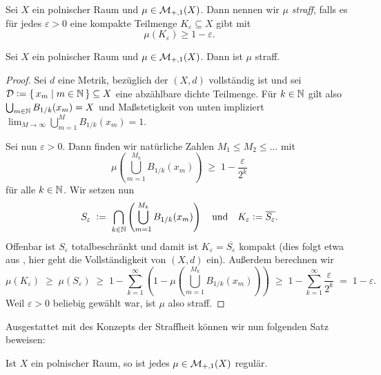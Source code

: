 \documentclass[../main/main.tex]{subfiles}
\begin{document}
	\begin{Definition}
		Sei $X$ ein polnischer Raum und $\mu \in \mathcal{M}_{+,1}(X)$. Dann nennen wir 
		$\mu$ \emph{straff}, falls es für jedes $\varepsilon > 0$ eine kompakte Teilmenge
		$K_\varepsilon \subseteq X$ gibt mit 
		\[ \mu(K_\varepsilon) \geq 1  - \varepsilon \text{.} \]
	\end{Definition}

	\begin{Satz}
		\label{thm:tightness}
		Sei $X$ ein polnischer Raum und $\mu \in \mathcal{M}_{+,1}(X)$. Dann ist $\mu$ straff.
	\end{Satz}

	\begin{proof}
		Sei $d$ eine Metrik, bezüglich der $(X, d)$ vollständig ist und sei 
		$\mathcal{D} \vcentcolon = \left\{\, x_m \; \middle| \; m \in \mathbb{N} \,\right\} \subseteq X$ eine abzählbare dichte Teilmenge. 
		Für $k \in \mathbb{N}$ gilt also $\bigcup_{m \in \mathbb{N}} B_{1/k}(x_m) = X$ und Maßstetigkeit 
		von unten impliziert 
		$\lim_{M \to \infty} \bigcup_{m=1}^{M} B_{1/k}(x_m) = 1$.
		
		Sei nun $\varepsilon > 0$. Dann finden wir natürliche Zahlen $M_1 \leq M_2 \leq \dots$ mit
		\[ \mu\left( \bigcup_{m=1}^{M_k} B_{1/k}(x_m) \right) \; \geq \; 1 - \frac{\varepsilon}{2^k} \]
		für alle $k \in \mathbb{N}$. Wir setzen nun
		\[ S_\varepsilon 
			\; \vcentcolon = \; \bigcap_{k \in \mathbb{N}} \left( \bigcup_{m=1}^{M_k} B_{1/k}(x_m) \right) 
			\quad \text{und} \quad K_\varepsilon \vcentcolon = \overline{S_\varepsilon} \text{.} \]
		Offenbar ist $S_\varepsilon$ totalbeschränkt und damit ist $K_\varepsilon = \overline{S_\varepsilon}$ 
		kompakt (dies folgt etwa aus \cite[Satz 2.3.8]{Simon.2015}, 
		hier geht die Vollständigkeit von $(X, d)$ ein).
		Außerdem berechnen wir
		\[ \mu(K_\varepsilon) 
			\; \geq \; \mu(S_\varepsilon) 
			\; \geq \; 1 - \sum_{k=1}^{\infty} \left( 1 - \mu\left( \bigcup_{m=1}^{M_k} B_{1/k}(x_m) \right) \right) 
			\; \geq \; 1 - \sum_{k=1}^{\infty} \frac{\varepsilon}{2^k} \; = \; 1 - \varepsilon \text{.} \]
		Weil $\varepsilon > 0$ beliebig gewählt war, ist $\mu$ also straff.
	\end{proof}

	Ausgestattet mit des Konzepts der Straffheit können wir nun folgenden Satz beweisen:

	\begin{Korollar}
		Ist $X$ ein polnischer Raum, so ist jedes $\mu \in \mathcal{M}_{+,1}(X)$ regulär.
	\end{Korollar}
\end{document}
